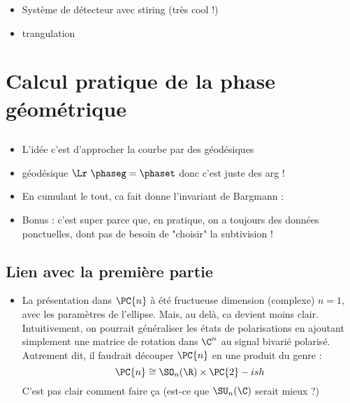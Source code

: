 
\begin{itemize}
	
	\item Système de détecteur avec stiring (très cool !)
	
	\item trangulation
\end{itemize}


\section{Calcul pratique de la phase géométrique}

\subsection{}

\begin{itemize}
	\item L'idée c'est d'approcher la courbe par des géodésiques
	
	\item géodésique $\Lr\ \phaseg = \phaset$ donc c'est juste des arg !
	
	\item En cumulant le tout, ca fait donne l'invariant de Bargmann :
	
	\item Bonus : c'est super parce que, en pratique, on a toujours des données ponctuelles, dont pas de besoin de "choisir" la subtivision !
\end{itemize}

\subsection{Lien avec la première partie}

\begin{itemize}
	\item La présentation dans $\PC{n}$ à été fructueuse dimension (complexe) $n=1$, avec les paramètres de l'ellipse. Mais, au delà, ca devient moins clair. Intuitivement, on pourrait généraliser les états de polarisations en ajoutant simplement une matrice de rotation dans $\C^n$ au signal bivarié polarisé. Autrement dit, il faudrait découper $\PC{n}$ en une produit du genre :
	\[\PC{n} \cong \SO_n(\R)\times \PC{2}-ish\]
	C'est pas clair comment faire ça (est-ce que $\SU_n(\C)$ serait mieux ?)
\end{itemize}



